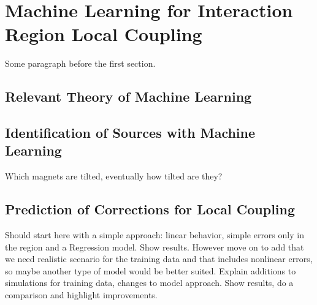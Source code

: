 
\chapter{Machine Learning for Interaction Region Local Coupling} %

\label{Chapter4} %




Some paragraph before the first section.


\section{Relevant Theory of Machine Learning}


\section{Identification of Sources with Machine Learning}

Which magnets are tilted, eventually how tilted are they?


\section{Prediction of Corrections for Local Coupling}

Should start here with a simple approach: linear behavior, simple errors only in the region and a Regression model.
Show results.
However move on to add that we need realistic scenario for the training data and that includes nonlinear errors, so maybe another type of model would be better suited.
Explain additions to simulations for training data, changes to model approach.
Show results, do a comparison and highlight improvements.

